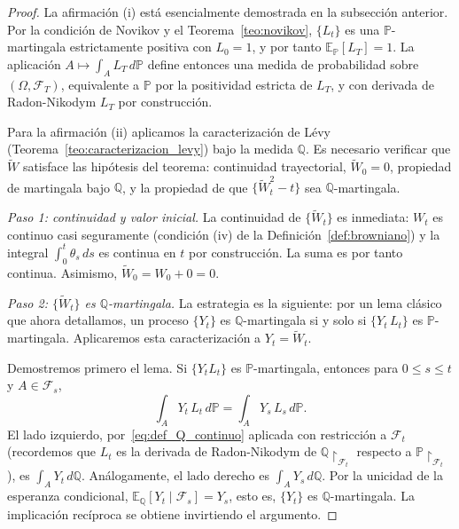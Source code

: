 \documentclass[11pt,a4paper,oneside]{report}
\theoremstyle{plain}
\theoremstyle{definition}
\theoremstyle{remark}
\newcommand{\E}{\mathbb{E}}
\newcommand{\PP}{\mathbb{P}}
\newcommand{\Q}{\mathbb{Q}}
\newcommand{\F}{\mathcal{F}}
\newcommand{\1}{\mathbf{1}}
\begin{document}
\begin{proof}
La afirmación (i) está esencialmente demostrada en la subsección
anterior. Por la condición de Novikov y el
Teorema~\ref{teo:novikov}, $\{L_t\}$ es una $\PP$-martingala
estrictamente positiva con $L_0 = 1$, y por tanto $\E_\PP[L_T] = 1$.
La aplicación $A \mapsto \int_A L_T\, d\PP$ define entonces una medida
de probabilidad sobre $(\Omega, \F_T)$, equivalente a $\PP$ por la
positividad estricta de $L_T$, y con derivada de Radon-Nikodym $L_T$
por construcción.

Para la afirmación (ii) aplicamos la
caracterización de Lévy (Teorema~\ref{teo:caracterizacion_levy}) bajo
la medida $\Q$. Es necesario verificar que $\widetilde{W}$ satisface las
hipótesis del teorema: continuidad trayectorial, $\widetilde{W}_0
= 0$, propiedad de martingala bajo $\Q$, y la propiedad de que
$\{\widetilde{W}_t^2 - t\}$ sea $\Q$-martingala.

\emph{Paso 1: continuidad y valor inicial.} La continuidad de
$\{\widetilde{W}_t\}$ es inmediata: $W_t$ es continuo casi seguramente
(condición (iv) de la Definición~\ref{def:browniano}) y la integral
$\int_0^t \theta_s\, ds$ es continua en $t$ por construcción. La suma
es por tanto continua. Asimismo, $\widetilde{W}_0 = W_0 + 0 = 0$.

\emph{Paso 2: $\{\widetilde{W}_t\}$ es $\Q$-martingala.} La estrategia
es la siguiente: por un lema clásico que ahora detallamos, un proceso
$\{Y_t\}$ es $\Q$-martingala si y solo si $\{Y_t\, L_t\}$ es
$\PP$-martingala. Aplicaremos esta caracterización a $Y_t =
\widetilde{W}_t$.

\noindent Demostremos primero el lema. Si $\{Y_t L_t\}$ es $\PP$-martingala,
entonces para $0 \leq s \leq t$ y $A \in \F_s$,
\begin{equation*}
  \int_A Y_t\, L_t\, d\PP = \int_A Y_s\, L_s\, d\PP.
\end{equation*}
El lado izquierdo, por~\eqref{eq:def_Q_continuo} aplicada con
restricción a $\F_t$ (recordemos que $L_t$ es la derivada
de Radon-Nikodym de $\Q\!\restriction_{\F_t}$ respecto a
$\PP\!\restriction_{\F_t}$), es $\int_A Y_t\, d\Q$. Análogamente, el
lado derecho es $\int_A Y_s\, d\Q$. Por la unicidad de la esperanza
condicional, $\E_\Q[Y_t \mid \F_s] = Y_s$, esto es, $\{Y_t\}$ es
$\Q$-martingala. La implicación recíproca se obtiene invirtiendo el
argumento.


\end{proof}
\end{document}

